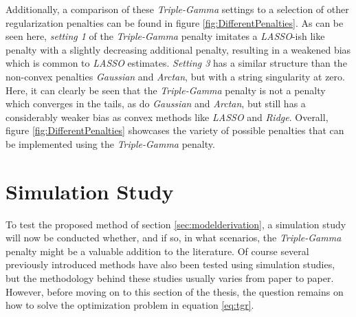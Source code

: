 \documentclass[12pt,a4paper]{article}
\newenvironment{lightbluebox}{%
    \begin{tcolorbox}[colback=lightblue, colframe=lightblue, fontupper=\itshape]%
}{%
    \end{tcolorbox}%
}
\begin{document}
Additionally, a comparison of these \textit{Triple-Gamma} settings to a selection of other regularization penalties can be found in figure \ref{fig:DifferentPenalties}. As can be seen here, \textit{setting 1} of the \textit{Triple-Gamma} penalty imitates a \textit{LASSO}-ish like penalty with a slightly decreasing additional penalty, resulting in a weakened bias which is common to \textit{LASSO} estimates. \textit{Setting 3} has a similar structure than the non-convex penalties \textit{Gaussian} and \textit{Arctan}, but with a string singularity at zero. Here, it can clearly be seen that the \textit{Triple-Gamma} penalty is not a penalty which converges in the tails, as do \textit{Gaussian} and \textit{Arctan}, but still has a considerably weaker bias as convex methods like \textit{LASSO} and \textit{Ridge}. Overall, figure \ref{fig:DifferentPenalties} showcases the variety of possible penalties that can be implemented using the \textit{Triple-Gamma} penalty. 






\newpage
\section{Simulation Study}\label{sec:simstudy_overall}
To test the proposed method of section \ref{sec:modelderivation}, a simulation study will now be conducted whether, and if so, in what scenarios, the \textit{Triple-Gamma} penalty might be a valuable addition to the literature. Of course several previously introduced methods have also been tested using simulation studies, but the methodology behind these studies usually varies from paper to paper. However, before moving on to this section of the thesis, the question remains on how to solve the optimization problem in equation \ref{eq:tgr}. 
\end{document}
